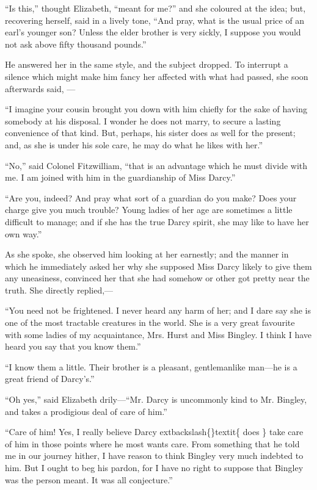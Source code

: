 \documentclass[10pt]{book}
\begin{document}
   “Is this,” thought Elizabeth, “meant for me?” and she coloured at the
idea; but, recovering herself, said in a lively tone, “And pray, what is
the usual price of an earl’s younger son? Unless the elder brother is
very sickly, I suppose you would not ask above fifty thousand pounds.”
  

   He answered her in the same style, and the subject dropped. To interrupt
a silence which might make him fancy her affected with what had passed,
she soon afterwards said,
   —
  

   “I imagine your cousin brought you down with him chiefly for the sake of
having somebody at his disposal. I wonder he does not marry, to secure a
lasting convenience of that kind. But, perhaps, his sister does as well
for the present; and, as she is under his sole care, he may do what he
likes with her.”
  

   “No,” said Colonel Fitzwilliam, “that is an advantage which he must
divide with me. I am joined with him in the guardianship of Miss Darcy.”
  

   “Are you, indeed? And pray what sort of a guardian do you make? Does
your charge give you much trouble? Young ladies of her age are sometimes
a little difficult to manage; and if she has the true Darcy spirit, she
may like to have her own way.”
  

   As she spoke, she observed him looking at her earnestly; and the manner
in which he immediately asked her why she supposed Miss Darcy likely to
give them any uneasiness, convinced her that she had somehow or other
got pretty near the truth. She directly replied,—
  

   “You need not be frightened. I never heard any harm of her; and I dare
say she is one of the most tractable creatures in the world. She is a
very great favourite with some ladies of my acquaintance, Mrs. Hurst and
Miss Bingley. I think I have heard you say that you know them.”
  

   “I know them a little. Their brother is a pleasant, gentlemanlike
man—he is a great friend of Darcy’s.”
  

   “Oh yes,” said Elizabeth drily—“Mr. Darcy is uncommonly kind to Mr.
Bingley, and takes a prodigious deal of care of him.”
  

   “Care of him! Yes, I really believe Darcy
   	extbackslash\{\}textit\{
    does
   \}
   take care of him in
those points where he most wants care.
   From something that he told me
in our journey hither, I have reason to think Bingley very much indebted
to him. But I ought to beg his pardon, for I have no right to suppose
that Bingley was the person meant. It was all conjecture.”
  
\end{document}
